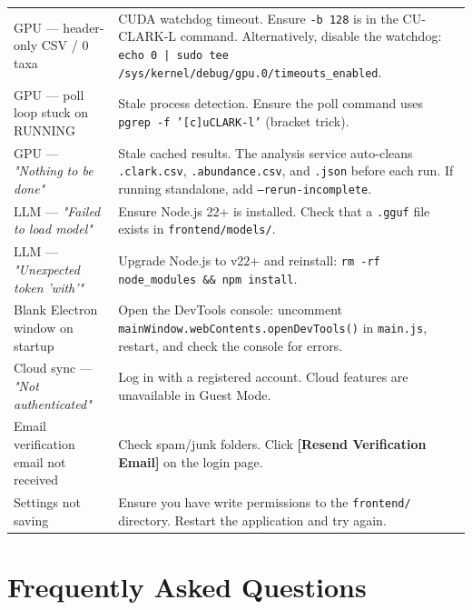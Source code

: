 \documentclass[12pt,a4paper]{report}
\newcommand{\btn}[1]{\textbf{\textcolor{primary}{[#1]}}}
\begin{document}
\begin{longtable}{p{5.5cm} p{9cm}}
  GPU — header-only CSV / 0 taxa &
  CUDA watchdog timeout. Ensure \texttt{-b 128} is in the CU-CLARK-L command. Alternatively, disable the watchdog: \texttt{echo 0 | sudo tee /sys/kernel/debug/gpu.0/timeouts\_enabled}. \\[4pt]

  GPU — poll loop stuck on RUNNING &
  Stale process detection. Ensure the poll command uses \texttt{pgrep -f '[c]uCLARK-l'} (bracket trick). \\[4pt]

  GPU — \textit{"Nothing to be done"} &
  Stale cached results. The analysis service auto-cleans \texttt{.clark.csv}, \texttt{.abundance.csv}, and \texttt{.json} before each run. If running standalone, add \texttt{--rerun-incomplete}. \\[4pt]

  LLM — \textit{"Failed to load model"} &
  Ensure Node.js 22+ is installed. Check that a \texttt{.gguf} file exists in \texttt{frontend/models/}. \\[4pt]

  LLM — \textit{"Unexpected token 'with'"} &
  Upgrade Node.js to v22+ and reinstall: \texttt{rm -rf node\_modules \&\& npm install}. \\[4pt]

  Blank Electron window on startup &
  Open the DevTools console: uncomment \texttt{mainWindow.webContents.openDevTools()} in \texttt{main.js}, restart, and check the console for errors. \\[4pt]

  Cloud sync — \textit{"Not authenticated"} &
  Log in with a registered account. Cloud features are unavailable in Guest Mode. \\[4pt]

  Email verification email not received &
  Check spam/junk folders. Click \btn{Resend Verification Email} on the login page. \\[4pt]

  Settings not saving &
  Ensure you have write permissions to the \texttt{frontend/} directory. Restart the application and try again. \\

  \bottomrule
\end{longtable}

\chapter{Frequently Asked Questions}
\end{document}
